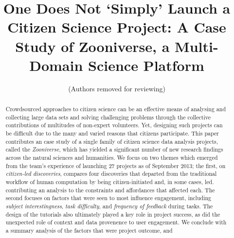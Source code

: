 \documentclass{sigchi}
\begin{document}
\title{One Does Not `Simply' Launch a Citizen Science Project: A Case Study of Zooniverse, a Multi-Domain Science Platform}

 \author{ (Authors removed for reviewing) }
% 
% 
% 


\maketitle

\begin{abstract}
Crowdsourced approaches to citizen science can be an effective means of analysing and collecting large data sets and solving challenging problems through the collective contributions of multitudes of non-expert volunteers. Yet, designing such projects can be difficult due to the many and varied reasons that citizens participate. This paper contributes an case study of a single family of citizen science data analysis projects, called the \emph{Zooniverse}, which has yielded a significant number of new research findings across the natural sciences and humanities.  We focus on two themes which emerged from the team's experience of launching 27 projects as of September 2013; the first, on \emph{citizen-led discoveries}, compares four discoveries that departed from the traditional workflow of human computation by being citizen-initiated and, in some cases, led. contributing an analysis to the constraints and affordances that affected each. The second focuses on factors that were seen to most influence engagement, including \emph{subject interestingness}, \emph{task difficulty}, and \emph{frequency of feedback} during tasks.  The design of the tutorials also ultimately played a key role in project success, as did the unexpected role of context and data provenence to user engagement.  We conclude with a summary analysis of the factors that were project outcome, and 
\end{abstract}


\end{document}
